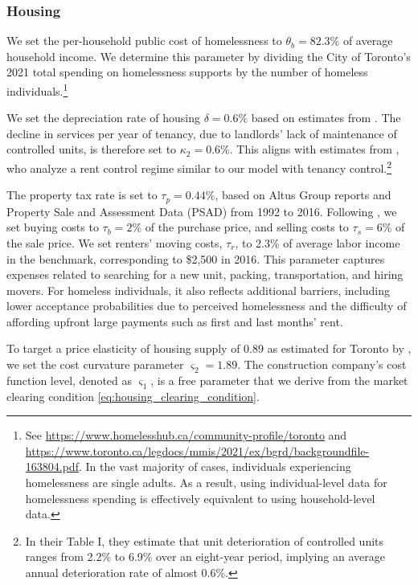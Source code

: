 \documentclass[parskip=full]{article}
\begin{document}
\subsubsection{Housing}

We set the per-household public cost of homelessness to $\theta_{b}=82.3\%$ of average household income. We determine this parameter by dividing the City of Toronto's 2021 total spending on homelessness supports by the number of homeless individuals.\footnote{See \url{https://www.homelesshub.ca/community-profile/toronto} and \url{https://www.toronto.ca/legdocs/mmis/2021/ex/bgrd/backgroundfile-163804.pdf}. In the vast majority of cases, individuals experiencing homelessness are single adults. As a result, using individual-level data for homelessness spending is effectively equivalent to using household-level data.}

We set the depreciation rate of housing $\delta=0.6\%$ based on estimates from \citet{rosenthal-2014}. The decline in services per year of tenancy, due to landlords' lack of maintenance of controlled units, is therefore set to $\kappa_{2}=0.6\%$. This aligns with estimates from \citet{murray_et_al-1991}, who analyze a rent control regime similar to our model with tenancy control.\footnote{In their Table I, they estimate that unit deterioration of controlled units ranges from 2.2\% to 6.9\% over an eight-year period, implying an average annual deterioration rate of almost 0.6\%.}

The property tax rate is set to $\tau_p=0.44\%$, based on Altus Group reports and Property Sale and Assessment Data (PSAD) from 1992 to 2016. Following \citet{gm-2003}, we set buying costs to $\tau_{b}=2\%$ of the purchase price, and selling costs to $\tau_{s}=6\% $ of the sale price. We set renters’ moving costs, $\tau_r$, to 2.3\% of average labor income in the benchmark, corresponding to \$2,500 in 2016. This parameter captures expenses related to searching for a new unit, packing, transportation, and hiring movers. For homeless individuals, it also reflects additional barriers, including lower acceptance probabilities due to perceived homelessness and the difficulty of affording upfront large payments such as first and last months’ rent.

To target a price elasticity of housing supply of 0.89 as estimated for Toronto by \citet{piaxao-2021}, we set the cost curvature parameter $\varsigma_{2}=1.89$. The construction company's cost function level, denoted as $\varsigma_1$, is a free parameter that we derive from the market clearing condition \eqref{eq:housing_clearing_condition}.
\end{document}
